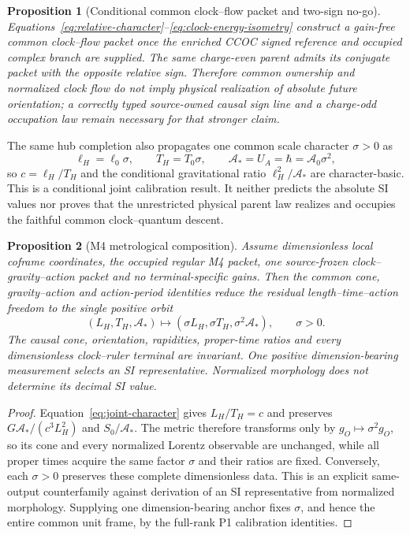 \documentclass[11pt]{article}
\newtheorem{proposition}{Proposition}
\begin{document}
\begin{proposition}[Conditional common clock--flow packet and two-sign no-go]
Equations~\eqref{eq:relative-character}--\eqref{eq:clock-energy-isometry}
construct a gain-free common clock--flow packet once the enriched CCOC signed
reference and occupied complex branch are supplied. The same charge-even
parent admits its conjugate packet with the opposite relative sign. Therefore
common ownership and normalized clock flow do not imply physical realization of
absolute future orientation; a correctly typed source-owned causal sign line
and a charge-odd occupation law remain necessary for that stronger claim.
\end{proposition}

The same hub completion also propagates one common scale character
$\sigma>0$ as
\begin{equation}
 \ell_H=\ell_0\sigma,
 \qquad T_H=T_0\sigma,
 \qquad \mathcal A_*=U_A=\hbar=\mathcal A_0\sigma^2,
 \label{eq:joint-character}
\end{equation}
so $c=\ell_H/T_H$ and the conditional gravitational ratio
$\ell_H^2/\mathcal A_*$ are character-basic. This is a conditional joint
calibration result. It neither predicts the absolute SI values nor proves
that the unrestricted physical parent law realizes and occupies the faithful
common clock--quantum descent.

\begin{proposition}[M4 metrological composition]
\label{prop:m4-metrological-composition}
Assume dimensionless local coframe coordinates, the occupied regular M4
packet, one source-frozen clock--gravity--action packet and no
terminal-specific gains. Then the common cone, gravity--action and
action-period identities reduce the residual length--time--action freedom to
the single positive orbit
\begin{equation}
 (L_H,T_H,\mathcal A_*)
 \longmapsto
 (\sigma L_H,\sigma T_H,\sigma^2\mathcal A_*),
 \qquad \sigma>0.
 \label{eq:m4-metrological-orbit}
\end{equation}
The causal cone, orientation, rapidities, proper-time ratios and every
dimensionless clock--ruler terminal are invariant. One positive
dimension-bearing measurement selects an SI representative. Normalized
morphology does not determine its decimal SI value.
\end{proposition}

\begin{proof}
Equation~\eqref{eq:joint-character} gives
$L_H/T_H=c$ and preserves
$G\mathcal A_*/(c^3L_H^2)$ and $S_0/\mathcal A_*$. The metric therefore
transforms only by $g_O\mapsto\sigma^2g_O$, so its cone and every normalized
Lorentz observable are unchanged, while all proper times acquire the same
factor $\sigma$ and their ratios are fixed. Conversely, each $\sigma>0$
preserves these complete dimensionless data. This is an explicit
same-output counterfamily against derivation of an SI representative from
normalized morphology. Supplying one dimension-bearing anchor fixes
$\sigma$, and hence the entire common unit frame, by the full-rank P1
calibration identities.
\end{proof}
\end{document}
